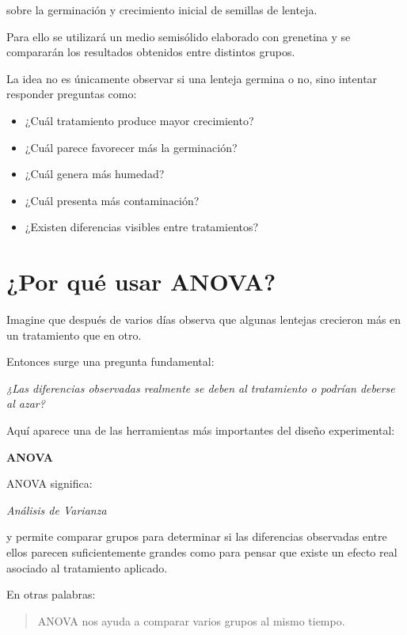 \documentclass[compacto,10pt,comentarios]{aleph-notas}
\begin{document}
sobre la germinación y crecimiento inicial de semillas de lenteja.

Para ello se utilizará un medio semisólido elaborado con grenetina y se compararán los resultados obtenidos entre distintos grupos.

La idea no es únicamente observar si una lenteja germina o no, sino intentar responder preguntas como:

\begin{itemize}
\item ¿Cuál tratamiento produce mayor crecimiento?
\item ¿Cuál parece favorecer más la germinación?
\item ¿Cuál genera más humedad?
\item ¿Cuál presenta más contaminación?
\item ¿Existen diferencias visibles entre tratamientos?
\end{itemize}

\section{¿Por qué usar ANOVA?}

Imagine que después de varios días observa que algunas lentejas crecieron más en un tratamiento que en otro.

Entonces surge una pregunta fundamental:

\begin{center}
\textit{¿Las diferencias observadas realmente se deben al tratamiento o podrían deberse al azar?}
\end{center}

Aquí aparece una de las herramientas más importantes del diseño experimental:

\begin{center}
\textbf{ANOVA}
\end{center}

ANOVA significa:

\begin{center}
\textit{Análisis de Varianza}
\end{center}

y permite comparar grupos para determinar si las diferencias observadas entre ellos parecen suficientemente grandes como para pensar que existe un efecto real asociado al tratamiento aplicado.

En otras palabras:

\begin{quote}
ANOVA nos ayuda a comparar varios grupos al mismo tiempo.
\end{quote}
\end{document}
